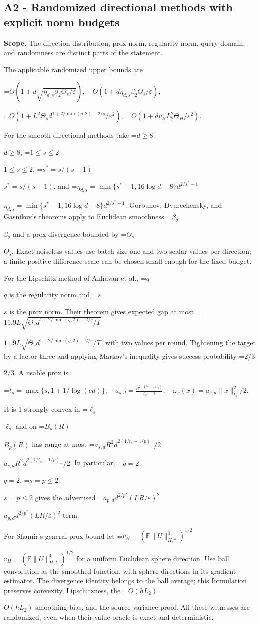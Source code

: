 \documentclass[10pt,a4paper]{article}
\newcommand{\AtlasMath}[1]{\par\begingroup\centering\setbox0=\hbox{$\displaystyle #1$}\ifdim\wd0>1.4\linewidth\typeout{ATLAS WIDE FORMULA: \the\wd0}\fi\ifdim\wd0>\linewidth\resizebox{\linewidth}{!}{\box0}\else\box0\fi\par\endgroup}
\newcommand{\AtlasInlineMath}[1]{\begingroup\setbox0=\hbox{$#1$}\ifdim\wd0>.4\linewidth\endgroup\AtlasMath{#1}\else\endgroup$#1$\fi}
\begin{document}
\subsection{A2 - Randomized directional methods with explicit norm budgets}
\textbf{Scope.} The direction distribution, prox norm, regularity norm, query domain, and randomness are distinct parts of the statement.

The applicable randomized upper bounds are

\AtlasMath{O(1+d\sqrt{\eta_{d,s}\beta_2\Theta_s/\varepsilon}),\quad O(1+d\eta_{d,s}\beta_2\Theta_s/\varepsilon),}


\AtlasMath{O(1+L^2\Theta_s d^{1+2/\min(q,2)-2/s}/\varepsilon^2),\quad O(1+dv_H L_2^2\Theta_H/\varepsilon^2).}


For the smooth directional methods take \AtlasInlineMath{d\ge8}, \AtlasInlineMath{1\le s\le2}, \AtlasInlineMath{s^*=s/(s-1)}, and \AtlasInlineMath{\eta_{d,s}=\min\{s^*-1,16\log d-8\}d^{2/s^*-1}}. Gorbunov, Dvurechensky, and Gasnikov's theorems apply to Euclidean smoothness \AtlasInlineMath{\beta_2} and a prox divergence bounded by \AtlasInlineMath{\Theta_s}. Exact noiseless values use batch size one and two scalar values per direction; a finite positive difference scale can be chosen small enough for the fixed budget.

For the Lipschitz method of Akhavan et al., \AtlasInlineMath{q} is the regularity norm and \AtlasInlineMath{s} is the prox norm. Their theorem gives expected gap at most \AtlasInlineMath{11.9L\sqrt{\Theta_s d^{1+2/\min(q,2)-2/s}/T}}, with two values per round. Tightening the target by a factor three and applying Markov's inequality gives success probability \AtlasInlineMath{2/3}. A usable prox is

\AtlasMath{t_s=\max\{s,1+1/\log(ed)\},\quad a_{s,d}=\frac{d^{2(1/s-1/t_s)}}{t_s-1},\quad\omega_s(x)=a_{s,d}\|x\|_{t_s}^2/2.}

It is 1-strongly convex in \AtlasInlineMath{\ell_s} and on \AtlasInlineMath{B_p(R)} has range at most \AtlasInlineMath{a_{s,d}R^2d^{2(1/t_s-1/p)_+}/2}. In particular, \AtlasInlineMath{q=2}, \AtlasInlineMath{s=p\le2} gives the advertised \AtlasInlineMath{a_{p,d}d^{2/p^*}(LR/\varepsilon)^2} term.

For Shamir's general-prox bound let \AtlasInlineMath{v_H=(\mathbb E\|U\|_{H,*}^4)^{1/2}} for a uniform Euclidean sphere direction. Use ball convolution as the smoothed function, with sphere directions in its gradient estimator. The divergence identity belongs to the ball average; this formulation preserves convexity, Lipschitzness, the \AtlasInlineMath{O(hL_2)} smoothing bias, and the source variance proof. All these witnesses are randomized, even when their value oracle is exact and deterministic.
\end{document}
